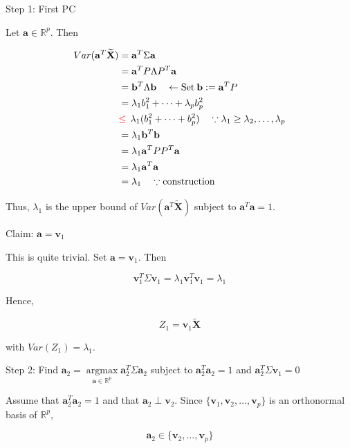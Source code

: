 \documentclass[]{book}
\DeclareMathOperator*{\argmax}{argmax}
\theoremstyle{definition}
\theoremstyle{definition}
\theoremstyle{definition}
\theoremstyle{remark}
\begin{document}
Step 1: First PC

Let \(\mathbf{a} \in \mathbb{R}^p\). Then

\begin{equation*}
  \begin{split}
    Var(\mathbf{a}^T \widetilde{\mathbf{X}}) & = \mathbf{a}^T \Sigma \mathbf{a} \\
    & = \mathbf{a}^T P\Lambda P^T \mathbf{a} \\
    & = \mathbf{b}^T \Lambda \mathbf{b} \quad \leftarrow \text{Set}\: \mathbf{b} := \mathbf{a}^T P \\
    & = \lambda_1 b_1^2 + \cdots + \lambda_p b_p^2 \\
    & {\color{red}{\le}} \:\: \lambda_1 (b_1^2 + \cdots + b_p^2) \quad \because \lambda_1 \ge \lambda_2, \ldots, \lambda_p \\
    & = \lambda_1 \mathbf{b}^T \mathbf{b} \\
    & = \lambda_1 \mathbf{a}^T P P^T \mathbf{a} \\
    & = \lambda_1 \mathbf{a}^T \mathbf{a} \\
    & = \lambda_1 \quad \because \text{construction}
  \end{split}
\end{equation*}

Thus, \(\lambda_1\) is the upper bound of \(Var(\mathbf{a}^T \widetilde{\mathbf{X}})\) subject to \(\mathbf{a}^T \mathbf{a} = 1\).

Claim: \(\mathbf{a} = \mathbf{v}_1\)

This is quite trivial. Set \(\mathbf{a} = \mathbf{v}_1\). Then

\[\mathbf{v}_1^T \Sigma \mathbf{v}_1 = \lambda_1 \mathbf{v}_1^T\mathbf{v}_1 = \lambda_1\]

Hence,

\[Z_1 = \mathbf{v}_1 \widetilde{\mathbf{X}}\]

with \(Var(Z_1) = \lambda_1\).

Step 2: Find \(\mathbf{a}_2 = \argmax\limits_{\mathbf{a} \in \mathbb{R}^p} \mathbf{a}_2^T \Sigma \mathbf{a}_2\) subject to \(\mathbf{a}_2^T \mathbf{a}_2 = 1\) and \(\mathbf{a}_2^T \Sigma \mathbf{v}_1 = 0\)

Assume that \(\mathbf{a}_2^T \mathbf{a}_2 = 1\) and that \(\mathbf{a}_2 \perp \mathbf{v}_2\). Since \(\{ \mathbf{v}_1, \mathbf{v}_2, \ldots, \mathbf{v}_p \}\) is an orthonormal basis of \(\mathbb{R}^p\),

\[\mathbf{a}_2 \in \{ \mathbf{v}_2, \ldots, \mathbf{v}_p \}\]
\end{document}
